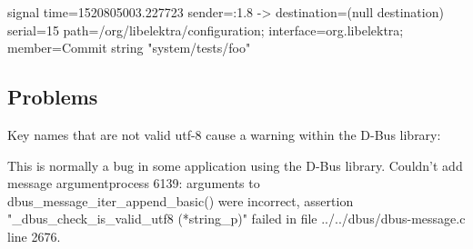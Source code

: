 \begin{DoxyCode}
signal time=1520805003.227723 sender=:1.8 -> destination=(null destination) serial=15
       path=/org/libelektra/configuration; interface=org.libelektra; member=Commit
   string "system/tests/foo"
\end{DoxyCode}
\hypertarget{autotoc_md153_autotoc_md164}{}\subsection{Problems}\label{autotoc_md153_autotoc_md164}
Key names that are not valid utf-\/8 cause a warning within the D-\/\+Bus library\+:


\begin{DoxyCode}
This is normally a bug in some application using the D-Bus library.
Couldn't add message argumentprocess 6139: arguments to dbus\_message\_iter\_append\_basic() were incorrect,
       assertion "\_dbus\_check\_is\_valid\_utf8 (*string\_p)" failed in file ../../dbus/dbus-message.c line 2676.
\end{DoxyCode}
 